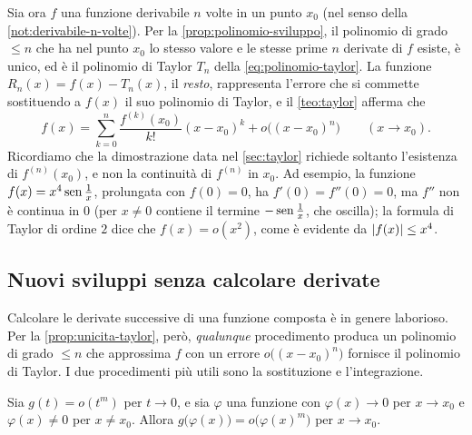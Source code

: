 Sia ora $f$ una funzione derivabile $n$ volte in un punto $x_{0}$ (nel senso della
\cref{not:derivabile-n-volte}). Per la \cref{prop:polinomio-sviluppo}, il polinomio di
grado $\le n$ che ha nel punto $x_{0}$ lo stesso valore e le stesse prime $n$ derivate di
$f$ esiste, è unico, ed è il polinomio di Taylor $T_{n}$ della
\eqref{eq:polinomio-taylor}. La funzione $R_{n}(x)=f(x)-T_{n}(x)$, il \emph{resto}, rappresenta
l'errore che si commette sostituendo a $f(x)$ il suo polinomio di Taylor, e il
\cref{teo:taylor} afferma che
\begin{equation}\label{eq:peano-richiamo}
  f(x)=\sum_{k=0}^{n}\frac{f^{(k)}(x_{0})}{k!}(x-x_{0})^{k}+o\bigl((x-x_{0})^{n}\bigr)
  \qquad (x\to x_{0}) .
\end{equation}
Ricordiamo che la dimostrazione data nel \cref{sec:taylor} richiede soltanto l'esistenza
di $f^{(n)}(x_{0})$, e non la continuità di $f^{(n)}$ in $x_{0}$. Ad esempio, la funzione
$f(x)=x^{4}\operatorname{sen}\frac1x$, prolungata con $f(0)=0$, ha $f'(0)=f''(0)=0$, ma $f''$ non è continua
in $0$ (per $x\neq0$ contiene il termine $-\operatorname{sen}\frac1x$, che oscilla); la formula di Taylor di
ordine $2$ dice che $f(x)=o(x^{2})$, come è evidente da $\lvert f(x)\rvert\le x^{4}$.

\subsection{Nuovi sviluppi senza calcolare derivate}

Calcolare le derivate successive di una funzione composta è in genere laborioso. Per la
\cref{prop:unicita-taylor}, però, \emph{qualunque} procedimento produca un polinomio di grado
$\le n$ che approssima $f$ con un errore $o\bigl((x-x_{0})^{n}\bigr)$ fornisce il polinomio di
Taylor. I due procedimenti più utili sono la sostituzione e l'integrazione.

\begin{lemma}\label{lem:sostituzione-o}
Sia $g(t)=o(t^{m})$ per $t\to0$, e sia $\varphi$ una funzione con $\varphi(x)\to0$ per $x\to x_{0}$ e
$\varphi(x)\neq0$ per $x\neq x_{0}$. Allora $g\bigl(\varphi(x)\bigr)=o\bigl(\varphi(x)^{m}\bigr)$ per $x\to x_{0}$.
\end{lemma}

\begin{schema}
\end{schema}

